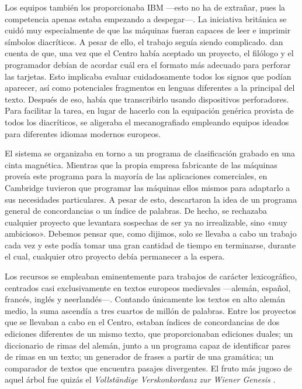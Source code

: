 Los equipos también los proporcionaba IBM —esto no ha de extrañar, pues la competencia apenas estaba empezando a despegar—. La iniciativa británica se cuidó muy especialmente de que las máquinas fueran capaces de leer e imprimir símbolos diacríticos. A pesar de ello, el trabajo seguía siendo complicado. \citeauthor{wisbey1968} dan cuenta de que, una vez que el Centro había aceptado un proyecto, el filólogo y el programador debían de acordar cuál era el formato más adecuado para perforar las tarjetas. Esto implicaba evaluar cuidadosamente todos los signos que podían aparecer, así como potenciales fragmentos en lenguas diferentes a la principal del texto. Después de eso, había que transcribirlo usando dispositivos perforadores. Para facilitar la tarea, en lugar de hacerlo con la equipación genérica provista de todos los diacríticos, se aligeraba el mecanografiado empleando equipos ideados para diferentes idiomas modernos europeos.
 
El sistema se organizaba en torno a un programa de clasificación grabado en una cinta magnética. Mientras que la propia empresa fabricante de las máquinas proveía este programa para la mayoría de las aplicaciones comerciales, en Cambridge tuvieron que programar las máquinas ellos mismos para adaptarlo a sus necesidades particulares. A pesar de esto, descartaron la idea de un programa general de concordancias o un índice de palabras. De hecho, se rechazaba cualquier proyecto que levantara sospechas de ser ya no irrealizable, sino «muy ambicioso». Debemos pensar que, como dijimos, solo se llevaba a cabo un trabajo cada vez y este podía tomar una gran cantidad de tiempo en terminarse, durante el cual, cualquier otro proyecto debía permanecer a la espera.

Los recursos se empleaban eminentemente para trabajos de carácter lexicográfico, centrados casi exclusivamente en textos europeos medievales —alemán, español, francés, inglés y neerlandés—. Contando únicamente los textos en alto alemán medio, la suma ascendía a tres cuartos de millón de palabras. Entre los proyectos que se llevaban a cabo en el Centro, estaban índices de concordancias de dos ediciones diferentes de un mismo texto, que proporcionaban ediciones duales; un diccionario de rimas del alemán, junto a un programa capaz de identificar pares de rimas en un texto; un generador de frases a partir de una gramática; un comparador de textos que encuentra pasajes divergentes. El fruto más jugoso de aquel árbol fue quizás el \textit{Vollständige Verskonkordanz zur \emph{Wiener Genesis}} \parencite{wisbey1967}.

